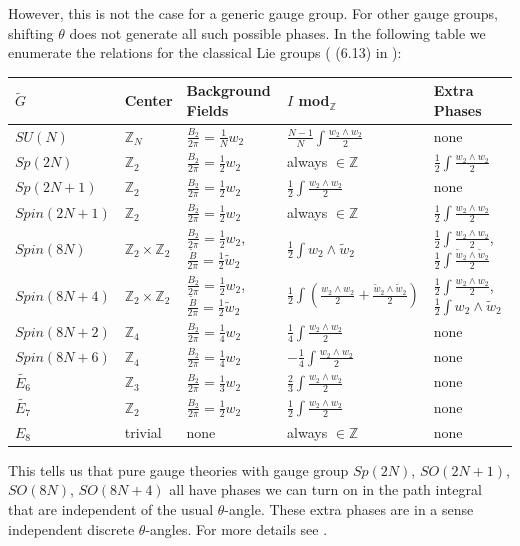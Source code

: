 \documentclass[11pt]{article}
\newcommand{\twopi}[1]{{\frac{#1}{2\pi}}}
\def\half{\frac{1}{2}}
\def\tB{{\tilde{B}}}
\def\IZ{{\mathbb{Z}}}
\begin{document}
However, this is not the case for a generic gauge group. For other gauge groups, shifting $\theta$ does not generate all such possible phases. In the following table we  enumerate the relations for the classical Lie groups ( (6.13) in \cite{Aharony:2013hda}):

\begin{center}
\begin{tabular}{l|l|l|l|l}
$\widetilde{G}$ & Center & Background Fields & $I$ mod$_\IZ$ & Extra Phases\\
\hline 
$SU(N)$ &$\IZ_N$& $\twopi{B_2}=\frac{1}{N}w_2$ & $\frac{N-1}{N}\int \frac{w_2\wedge w_2}{2}$ & none\\[0.2cm]
$Sp(2N)$ & $\IZ_2$&$\twopi{B_2}=\half w_2$& always $\in \IZ$ & $\half \int \frac{w_2\wedge w_2}{2}$\\[0.2cm]
$Sp(2N+1)$& $\IZ_2$&$\twopi{B_2}=\half w_2$& $\half \int \frac{w_2\wedge w_2}{2}$& none\\[0.2cm]
$Spin(2N+1)$ & $\IZ_2$ &$\twopi{B_2}=\half w_2$& always $\in\IZ$ & $\half \int \frac{w_2\wedge w_2}{2}$ \\[0.2cm]
$Spin(8N)$ &$\IZ_2\times \IZ_2$ & $\twopi{B_2}=\half w_2$, $\frac{\tB}{2\pi}=\half \tilde{w}_2$ & $\half \int w_2\wedge \tilde{w}_2$ & $\half \int \frac{w_2\wedge w_2}{2}$, $\half \int \frac{\tilde{w}_2\wedge \tilde{w}_2}{2}$\\[0.2cm]
$Spin(8N+4)$  &$\IZ_2\times \IZ_2$ & $\twopi{B_2}=\half w_2$, $\frac{\tB}{2\pi}=\half \tilde{w}_2$ & $\half \int \left( \frac{w_2\wedge w_2}{2}+ \frac{\tilde{w}_2\wedge \tilde{w}_2}{2}\right)$ & $\half \int  \frac{w_2\wedge w_2}{2} $, $\half \int w_2\wedge \tilde{w}_2$\\[0.2cm]
$Spin(8N+2)$ & $\IZ_4$ & $\twopi{B_2}=\frac{1}{4} w_2$ & $\frac{1}{4} \int \frac{w_2\wedge w_2}{2}$&none\\[0.2cm]
$Spin(8N+6)$ & $\IZ_4$ & $\twopi{B_2}=\frac{1}{4} w_2$ & $-\frac{1}{4} \int \frac{w_2\wedge w_2}{2}$&none\\[0.2cm]
$\widetilde{E_6}$ & $\IZ_3$ & $\twopi{B_2}=\frac{1}{3}w_2$ & $ \frac{2}{3}\int \frac{w_2\wedge w_2}{2}$ & none\\[0.2cm]
$\widetilde{E_7}$ & $\IZ_2$ & $\twopi{B_2}=\half w_2$ & $\half \int \frac{w_2\wedge w_2}{2}$ & none\\[0.2cm]
$E_8 $ & trivial & none & always $\in \IZ$& none
\end{tabular}
\end{center} 
This tells us that pure gauge theories with gauge group $Sp(2N)$, $SO(2N+1)$, $SO(8N)$, $SO(8N+4)$ all have phases we can turn on in the path integral that are independent of the usual $\theta$-angle. These extra phases are in a sense independent  discrete $\theta$-angles. For more details see \cite{Aharony:2013hda,Hsin:2020nts}.
\end{document}
